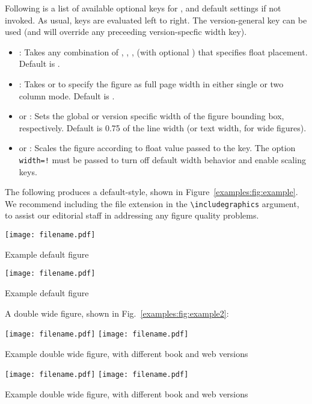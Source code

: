 Following is a list of available optional keys for , and default settings if not invoked.
As usual, keys are evaluated left to right. 
The version-general  key can be used (and will override any preceeding version-specfic width key).
\begin{itemize}
	\item {}: Takes any combination of , , ,  (with optional \invt{\!}) that specifies float placement. Default is .
	\item {}: Takes  or  to specify the figure as full page width in either single or two column mode. Default is .
	\item {} or : Sets the global or version specific width of the figure bounding box, respectively. Default is 0.75 of the line width (or text width, for wide figures).
	\item {} or : Scales the figure according to float value passed to the key. 
	The option \lstinline{width=!} must be passed to turn off default width behavior and enable scaling keys.
\end{itemize}

The following produces a default-style, shown in Figure~\ref{examples:fig:example}. 
We recommend including the file extension in the \lstinline{\includegraphics} argument, to assist our editorial staff in addressing any figure quality problems.
\begin{verbtex}
\begin{pdgxfigure}[place=t] 
	\texttt{[image: filename.pdf]}
	\caption{Example default figure}
	\label{examples:fig:example}
\end{pdgxfigure}
\end{verbtex}
\begin{pdgxfigure}[place=t]
	\texttt{[image: filename.pdf]}
	\caption{Example default figure}
	\label{examples:fig:example}
\end{pdgxfigure}

A double wide figure, shown in Fig.~\ref{examples:fig:example2}:
\begin{verbtex}
\begin{pdgxfigure}[wide=true,place=h, webwidth=0.45\linewidth, 
		bookwidth=0.9\linewidth] 
	\texttt{[image: filename.pdf]}\hfill
	\texttt{[image: filename.pdf]}
	\caption{Example double wide figure, 
		with different book and web versions}
	\label{examples:fig:example2}
\end{pdgxfigure}
\end{verbtex}
\begin{pdgxfigure}[wide=true,place=h,width=0.45\textwidth] 
	\texttt{[image: filename.pdf]}\hfill
	\texttt{[image: filename.pdf]}
	\caption{Example double wide figure, with different book and web versions}
	\label{examples:fig:example2}
\end{pdgxfigure}


